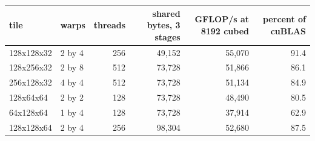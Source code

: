 \begin{tabular}{llrrrr}
\toprule
tile & warps & threads & shared bytes, 3 stages & GFLOP/s at 8192 cubed & percent of cuBLAS \\
\midrule
128x128x32 & 2 by 4 & 256 & 49,152 & 55,070 & 91.4 \\
128x256x32 & 2 by 8 & 512 & 73,728 & 51,866 & 86.1 \\
256x128x32 & 4 by 4 & 512 & 73,728 & 51,134 & 84.9 \\
128x64x64 & 2 by 2 & 128 & 73,728 & 48,490 & 80.5 \\
64x128x64 & 1 by 4 & 128 & 73,728 & 37,914 & 62.9 \\
128x128x64 & 2 by 4 & 256 & 98,304 & 52,680 & 87.5 \\
\bottomrule
\end{tabular}
